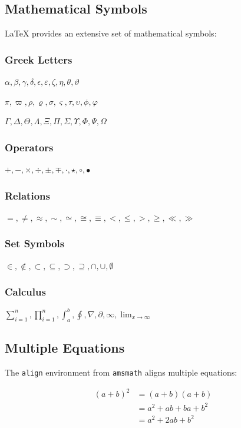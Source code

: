 \subsection{Mathematical Symbols}\label{subsec:mathematical-symbols}
LaTeX provides an extensive set of mathematical symbols:

\subsubsection{Greek Letters}\label{subsubsec:greek-letters}
$\alpha, \beta, \gamma, \delta, \epsilon, \varepsilon, \zeta, \eta, \theta, \vartheta$

$\pi, \varpi, \rho, \varrho, \sigma, \varsigma, \tau, \upsilon, \phi, \varphi$

$\Gamma, \Delta, \Theta, \Lambda, \Xi, \Pi, \Sigma, \Upsilon, \Phi, \Psi, \Omega$

\subsubsection{Operators}\label{subsubsec:operators}
$+, -, \times, \div, \pm, \mp, \cdot, \star, \circ, \bullet$

\subsubsection{Relations}\label{subsubsec:relations}
$=, \neq, \approx, \sim, \simeq, \cong, \equiv, <, \leq, >, \geq, \ll, \gg$

\subsubsection{Set Symbols}\label{subsubsec:set-symbols}
$\in, \notin, \subset, \subseteq, \supset, \supseteq, \cap, \cup, \emptyset$

\subsubsection{Calculus}\label{subsubsec:calculus}
$\sum_{i=1}^{n}, \prod_{i=1}^{n}, \int_{a}^{b}, \oint, \nabla, \partial, \infty, \lim_{x \to \infty}$

\subsection{Multiple Equations}\label{subsec:multiple-equations}
The \texttt{align} environment from \texttt{amsmath} aligns multiple equations:

\begin{align}
    (a+b)^2 &= (a+b)(a+b) \\
    &= a^2 + ab + ba + b^2 \\
    &= a^2 + 2ab + b^2
    \label{eq:binomial-expansion}
\end{align}

